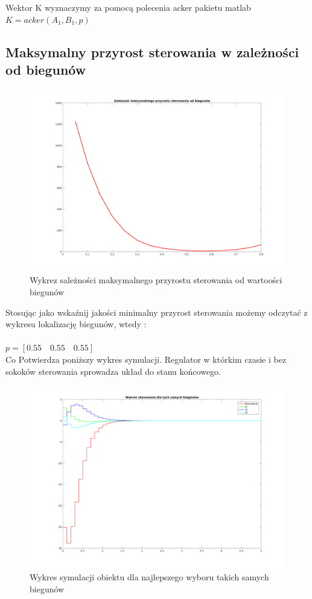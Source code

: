 \documentclass[a4paper, 11pt]{article}
\begin{document}
\noindent Wektor K wyznaczymy za pomocą polecenia acker pakietu matlab\\

$K = acker(A_1,B_1,p)$\\

\subsection{Maksymalny przyrost sterowania w zależności od biegunów} 
\begin{figure}[ht]
\centering
\includegraphics[scale=0.5]{3_1.png}
\caption{Wykrez sależności maksymalnego przyrostu sterowania od wartoości biegunów}
\end{figure}


\noindent Stosując jako wskaźnij jakości minimalny przyrost sterowania możemy odczytać z wykresu lokalizację biegunów, wtedy :\\
\\

$p = [0.55\quad0.55\quad 0.55]$\\

\noindent Co Potwierdza poniższy wykres symulacji. Regulator w którkim czasie i bez sokoków sterowania sprowadza układ do stanu końcowego. 

\begin{figure}[H]
\centering
\includegraphics[scale=0.5]{3_t.png}
\caption{Wykres symulacji obiektu dla najlepszego wyboru takich samych biegunów}
\end{figure}
\end{document}
